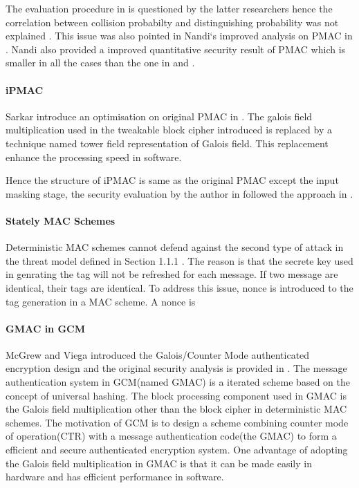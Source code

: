 \documentclass{article}
\begin{document}
The evaluation procedure in \cite{pmac} is questioned by the latter researchers hence the correlation between collision probabilty and 
distinguishing probability was not explained . This issue was also pointed in Nandi`s improved analysis on PMAC in \cite{improve_pmac}. Nandi also provided a improved quantitative security result of PMAC which is smaller in all the cases than the one in \cite{pmac} and \cite{new}. 

\paragraph{iPMAC}
Sarkar introduce an optimisation on original PMAC in \cite{iPMAC}. The galois field multiplication used in the tweakable block cipher introduced is replaced by a technique named tower field representation of Galois field. This replacement enhance the processing speed in software.

Hence the structure of iPMAC is same as the original PMAC except the input masking stage, the security evaluation by the author in \cite{iPMAC} followed the approach in \cite{pmac}.

\paragraph{Stately MAC Schemes}
Deterministic MAC schemes cannot defend against the second type of attack in the threat model defined in Section 1.1.1 . The reason is that the secrete key used in genrating the tag will not be refreshed for each message. If two message are identical, their tags are identical. To address this issue, nonce is introduced to the tag generation in a MAC scheme. A nonce is 
\paragraph{GMAC in GCM}
McGrew and Viega introduced the Galois/Counter Mode authenticated encryption design and the original security analysis is provided in \cite{gcm}. The message authentication system in GCM(named GMAC) is a iterated scheme based on the concept of universal hashing. The block processing component used in GMAC is the Galois field multiplication other than the block cipher in deterministic MAC schemes. 
The motivation of GCM is to design a scheme combining counter mode of operation(CTR) with a message authentication code(the GMAC) to form a efficient and secure authenticated encryption system.
One advantage of adopting the Galois field multiplication in GMAC is that it can be made easily in hardware and has efficient performance in software. 
\end{document}
